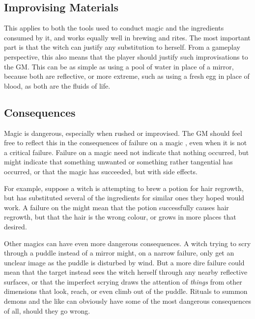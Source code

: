 \subsection{Improvising Materials}

This applies to both the tools used to conduct magic and the ingredients consumed by it, and works equally well in brewing and rites.
The most important part is that the witch can justify any substitution to herself.
From a gameplay perspective, this also means that the player should justify such improvisations to the GM.
This can be as simple as using a pool of water in place of a mirror, because both are reflective, or more extreme, such as using a fresh egg in place of blood, as both are the fluids of life.


\subsection{Consequences}

Magic is dangerous, especially when rushed or improvised.
The GM should feel free to reflect this in the consequences of failure on a magic {\test}, even when it is not a critical failure.
Failure on a magic {\test} need not indicate that nothing occurred, but might indicate that something unwanted or something rather tangential has occurred, or that the magic has succeeded, but with side effects.

For example, suppose a witch is attempting to brew a potion for hair regrowth, but has substituted several of the ingredients for similar ones they hoped would work.
A failure on the {\test} might mean that the potion successfully causes hair regrowth, but that the hair is the wrong colour, or grows in more places that desired.

Other magics can have even more dangerous consequences.
A witch trying to scry through a puddle instead of a mirror might, on a narrow failure, only get an unclear image as the puddle is disturbed by wind.
But a more dire failure could mean that the target instead sees the witch herself through any nearby reflective surfaces, or that the imperfect scrying draws the attention of \emph{things} from other dimensions that look, reach, or even climb out of the puddle.
Rituals to summon demons and the like can obviously have some of the most dangerous consequences of all, should they go wrong.
